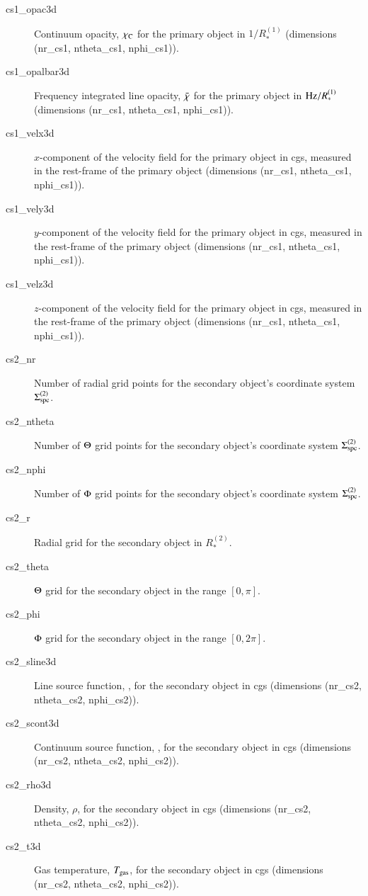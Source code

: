 \documentclass[10pt,a4paper]{article}
\begin{document}
\begin{enumerate}
\begin{description}
    \item[cs1\_opac3d] Continuum opacity, $\chi_{\rm C}$ for the primary object in $1/R_\ast^{(1)}$ (dimensions (nr\_cs1, ntheta\_cs1, nphi\_cs1)).
    \item[cs1\_opalbar3d] Frequency integrated line opacity, $\bar{\chi}$ for the primary object in ${\rm Hz}/R_\ast^{(1)}$ (dimensions (nr\_cs1, ntheta\_cs1, nphi\_cs1)).      
    \item[cs1\_velx3d] $x$-component of the velocity field for the primary object in cgs, measured in the rest-frame of the primary object (dimensions (nr\_cs1, ntheta\_cs1, nphi\_cs1)).
    \item[cs1\_vely3d] $y$-component of the velocity field for the primary object in cgs, measured in the rest-frame of the primary object (dimensions (nr\_cs1, ntheta\_cs1, nphi\_cs1)).
    \item[cs1\_velz3d] $z$-component of the velocity field for the primary object in cgs, measured in the rest-frame of the primary object (dimensions (nr\_cs1, ntheta\_cs1, nphi\_cs1)).
    \item[]
    \item[cs2\_nr] Number of radial grid points for the secondary object's coordinate system $\Sigma_{\rm spc}^{(2)}$.
    \item[cs2\_ntheta] Number of $\Theta$ grid points for the secondary object's coordinate system $\Sigma_{\rm spc}^{(2)}$.
    \item[cs2\_nphi] Number of $\Phi$ grid points for the secondary object's coordinate system $\Sigma_{\rm spc}^{(2)}$.
    \item[cs2\_r] Radial grid for the secondary object in $R_\ast^{(2)}$.
    \item[cs2\_theta] $\Theta$ grid for the secondary object in the range $[0,\pi]$.
    \item[cs2\_phi] $\Phi$ grid for the secondary object in the range $[0,2\pi]$.
    \item[cs2\_sline3d] Line source function, \sline, for the secondary object in cgs (dimensions (nr\_cs2, ntheta\_cs2, nphi\_cs2)).
    \item[cs2\_scont3d] Continuum source function, \scont, for the secondary object in cgs (dimensions (nr\_cs2, ntheta\_cs2, nphi\_cs2)).
    \item[cs2\_rho3d] Density, $\rho$, for the secondary object in cgs (dimensions (nr\_cs2, ntheta\_cs2, nphi\_cs2)).
    \item[cs2\_t3d] Gas temperature, $T_{\rm gas}$, for the secondary object in cgs (dimensions (nr\_cs2, ntheta\_cs2, nphi\_cs2)).

\end{description}
\end{enumerate}
\end{document}
